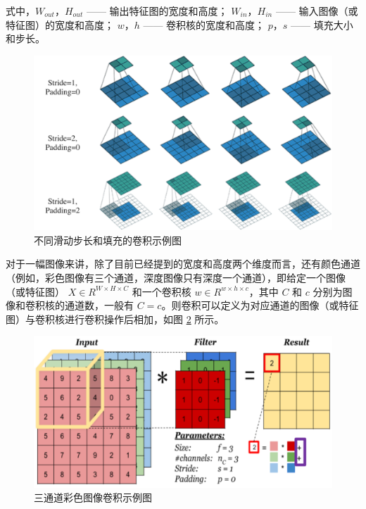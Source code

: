 \noindent 式中，$W_{out}$，$H_{out}$ —— 输出特征图的宽度和高度；\newline
\indent\quad $W_{in}$，$H_{in}$ —— 输入图像（或特征图）的宽度和高度；\newline
\indent\quad $w$，$h$ —— 卷积核的宽度和高度；\newline
\indent\quad $p$，$s$ —— 填充大小和步长。

\begin{figure}[!htbp]
	\centering
	\includegraphics{figures/3.png}
	\caption{不同滑动步长和填充的卷积示例图}
	\label{fig:fig2-2}
\end{figure}

对于一幅图像来讲，除了目前已经提到的宽度和高度两个维度而言，还有颜色通道（例如，彩色图像有三个通道，深度图像只有深度一个通道），即给定一个图像（或特征图） $X\in R^{W\times H\times C}$ 和一个卷积核 $w\in R^{w\times h\times c}$，其中 $C$ 和 $c$ 分别为图像和卷积核的通道数，一般有 $C=c$。则卷积可以定义为对应通道的图像（或特征图）与卷积核进行卷积操作后相加，如图 \ref{fig:fig2-3} 所示。

\begin{figure}[!htbp]
	\centering
	\includegraphics{figures/4.png}
	\caption{三通道彩色图像卷积示例图}
	\label{fig:fig2-3}
\end{figure}

